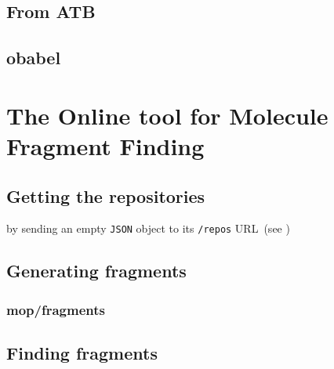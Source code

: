 \subsection{From ATB}
\nlipsum

\subsection{obabel}
\nlipsum


\section[\omfraf]{The Online tool for Molecule Fragment Finding}
\nlipsum

\subsection{Getting the repositories}
 by sending an empty \verb|JSON| object to its \verb|/repos| URL~(see )
\nlipsum

\subsection{Generating fragments}
\nlipsum

\subsubsection{mop/fragments}
\nlipsum

\subsection{Finding fragments}
\nlipsum
